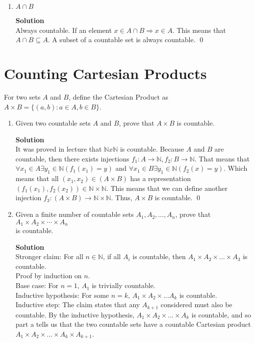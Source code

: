 \documentclass[11pt]{article}
\newcommand*{\Question}[1]{\section{#1}}
\newenvironment{Parts}{\begin{enumerate}[label=(\alph*)]}{\end{enumerate}}
\newcommand*{\Part}{\item}
\begin{document}
\begin{Parts}
\Part $A \cap B$
\begin{mdframed} \textbf{Solution} \\
Always countable. If an element $x \in A \cap B \Rightarrow x \in A$. This means that $A \cap B \subseteq A$. A subset of a countable set is always countable. \qed 
\end{mdframed}

\end{Parts}


\Question{Counting Cartesian Products}

For two sets $A$ and $B$, define the Cartesian Product as $A \times B = \{(a,b) : a \in A, b \in B \}$.

\begin{Parts}
    \Part Given two countable sets $A$ and $B$, prove that $A \times B$ is countable.
\begin{mdframed} \textbf{Solution} \\
It was proved in lecture that $\mathbb{N}x\mathbb{N}$ is countable. Because $A$ and $B$ are countable, then there exists injections $f_1:A \rightarrow \mathbb{N}, f_2:B \rightarrow \mathbb{N}$. That means that $\forall x_1 \in A \exists y_1 \in \mathbb{N}(f_1(x_1)=y)$ and $\forall x_1 \in B \exists y_1 \in \mathbb{N}(f_2(x)=y)$. Which means that all $(x_1,x_2) \in (A \times B)$ has a representation $(f_1(x_1), f_2(x_2)) \in \mathbb{N} \times \mathbb{N}$. This means that we can define another injection $f_3:(A \times B) \rightarrow \mathbb{N} \times \mathbb{N}$. Thus, $A \times B$ is countable. \qed
\end{mdframed}

    \Part Given a finite number of countable sets $A_1, A_2, \dots, A_n$, prove that 
    $A_1 \times A_2 \times \cdots \times A_n$ \\is countable. 
\begin{mdframed} \textbf{Solution} \\
Stronger claim: For all $n \in \mathbb{N}$, if all $A_i$ is countable, then $A_1 \times A_2 \times ... \times A_3$ is countable. \\
Proof by induction on $n$. \\
Base case: For $n=1$, $A_1$ is trivially countable. \\
Inductive hypothesis: For some $n=k$, $A_1 \times A_2 \times ... A_k$ is countable. \\
Inductive step: The claim states that any $A_{k+1}$ considered must also be countable. By the inductive hypothesis, $A_1 \times A_2 \times ... \times A_k$ is countable, and so part a tells us that the two countable sets have a countable Cartesian product $A_1 \times A_2 \times ... \times A_k \times A_{k+1}$. 
\end{mdframed}


\end{Parts}
\end{document}

